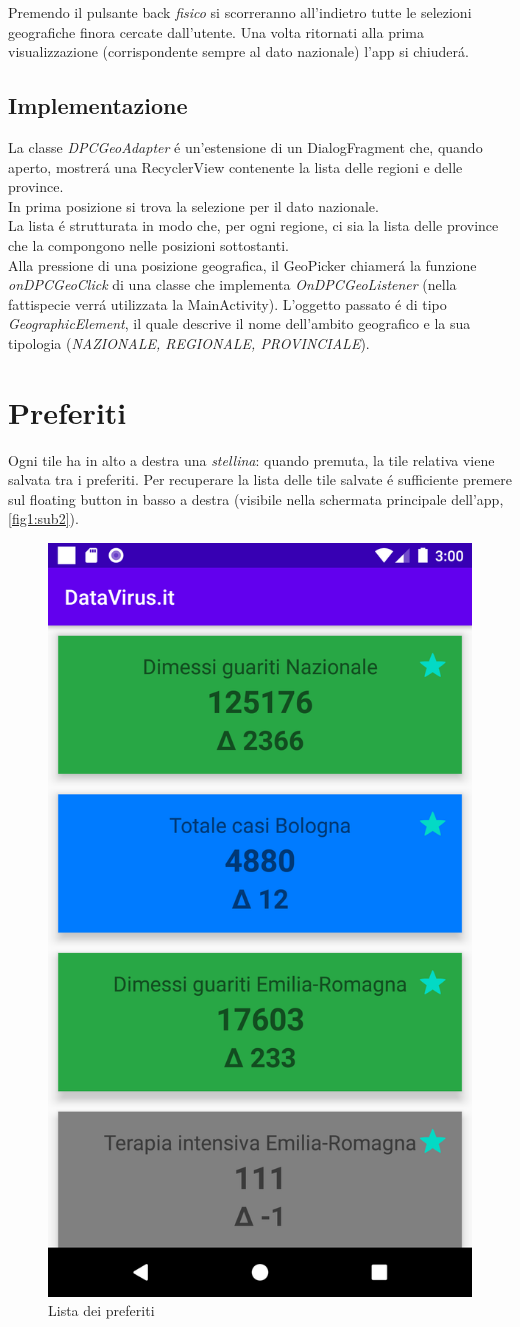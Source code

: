 \documentclass{article}
\begin{document}
    Premendo il pulsante back \emph{fisico} si scorreranno all'indietro tutte le selezioni geografiche finora cercate dall'utente. Una volta ritornati alla prima visualizzazione (corrispondente sempre al dato nazionale) l'app si chiuderá.

    \subsection{Implementazione}

    La classe \emph{DPCGeoAdapter} é un'estensione di un DialogFragment che, quando aperto, mostrerá una RecyclerView contenente la lista delle regioni e delle province. 
    \\
    In prima posizione si trova la selezione per il dato nazionale.
    \\
    La lista é strutturata in modo che, per ogni regione, ci sia la lista delle province che la compongono nelle posizioni sottostanti. 
    \\
    Alla pressione di una posizione geografica, il GeoPicker chiamerá la funzione \emph{onDPCGeoClick} di una classe che implementa \emph{OnDPCGeoListener} (nella fattispecie verrá utilizzata la MainActivity).
    L'oggetto passato é di tipo \emph{GeographicElement}, il quale descrive il nome dell'ambito geografico e la sua tipologia (\emph{NAZIONALE, REGIONALE, PROVINCIALE}).

    \section{Preferiti}
    \label{preferiti}
    Ogni tile ha in alto a destra una \emph{stellina}: quando premuta, la tile relativa viene salvata tra i preferiti.
    Per recuperare la lista delle tile salvate é sufficiente premere sul floating button in basso a destra (visibile nella schermata principale dell'app, \ref{fig1:sub2}).

    \begin{figure}[h]
        \centering
        \includegraphics[width=.5\linewidth]{preferences.png}
        \caption{Lista dei preferiti}
        \label{fig4}
    \end{figure}
\end{document}

